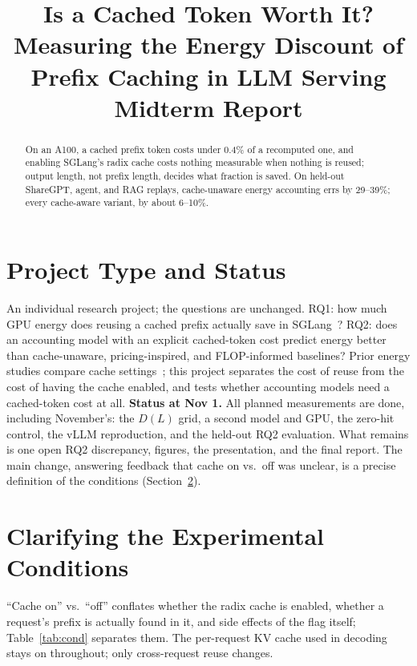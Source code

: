 \documentclass[conference]{IEEEtran}
\begin{document}
\title{Is a Cached Token Worth It? Measuring the Energy Discount of Prefix Caching in LLM Serving\\[2pt]
\large Midterm Report}

\author{
}

\maketitle

\begin{abstract}
On an A100, a cached prefix token costs under 0.4\% of a recomputed one, and enabling SGLang's radix cache costs nothing measurable when nothing is reused; output length, not prefix length, decides what fraction is saved. On held-out ShareGPT, agent, and RAG replays, cache-unaware energy accounting errs by 29--39\%; every cache-aware variant, by about 6--10\%.
\end{abstract}

\section{Project Type and Status}
An individual research project; the questions are unchanged. RQ1: how much GPU energy does reusing a cached prefix actually save in SGLang~\cite{sglang}? RQ2: does an accounting model with an explicit cached-token cost predict energy better than cache-unaware, pricing-inspired, and FLOP-informed baselines? Prior energy studies compare cache settings~\cite{zine,prefixbench}; this project separates the cost of reuse from the cost of having the cache enabled, and tests whether accounting models need a cached-token cost at all. \textbf{Status at Nov 1.} All planned measurements are done, including November's: the $D(L)$ grid, a second model and GPU, the zero-hit control, the vLLM reproduction, and the held-out RQ2 evaluation. What remains is one open RQ2 discrepancy, figures, the presentation, and the final report. The main change, answering feedback that cache on vs.\ off was unclear, is a precise definition of the conditions (Section~\ref{sec:conditions}).

\section{Clarifying the Experimental Conditions}
\label{sec:conditions}
``Cache on'' vs.\ ``off'' conflates whether the radix cache is enabled, whether a request's prefix is actually found in it, and side effects of the flag itself; Table~\ref{tab:cond} separates them. The per-request KV cache used in decoding stays on throughout; only cross-request reuse changes.
\end{document}
